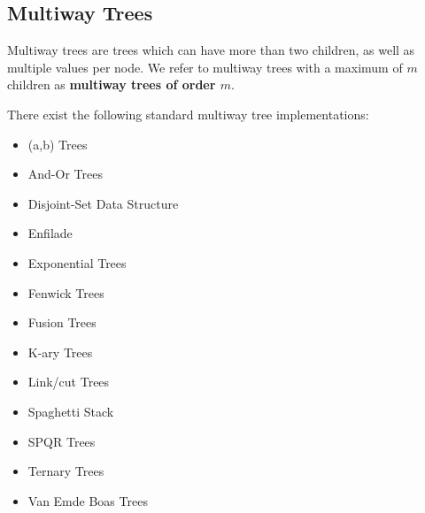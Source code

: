 \documentclass[12pt]{article}
\begin{document}
\subsection{Multiway Trees}
Multiway trees are trees which can have more than two children, as well as multiple values per node. We refer to multiway trees with a maximum of $m$ children as {\bf multiway trees of order $m$}.

There exist the following standard multiway tree implementations:
\begin{itemize}
\item (a,b) Trees
\item And-Or Trees
\item Disjoint-Set Data Structure
\item Enfilade
\item Exponential Trees
\item Fenwick Trees
\item Fusion Trees
\item K-ary Trees
\item Link/cut Trees
\item Spaghetti Stack
\item SPQR Trees
\item Ternary Trees
\item Van Emde Boas Trees
\end{itemize}
\end{document}
